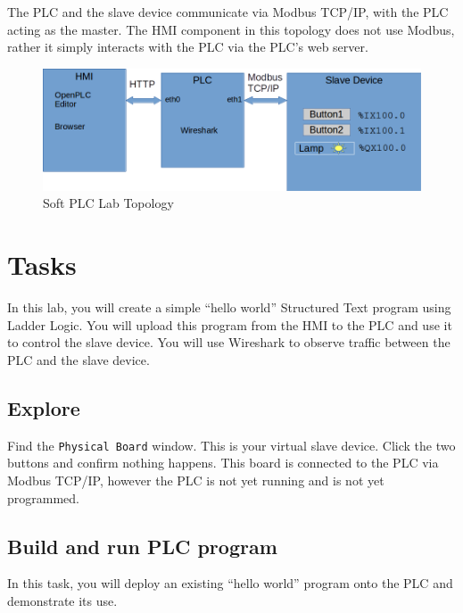 The PLC and the slave device communicate via Modbus TCP/IP, with the PLC acting as the master.  
The HMI component in this topology does not use Modbus, rather it simply interacts with the PLC via the
PLC's web server.
\begin{figure}[H]
\begin{center}
\includegraphics [width=0.8\linewidth]{softplc2.png}
\end{center}
\caption{Soft PLC Lab Topology}
\label{fig:topology}
\end{figure}

\section{Tasks}
In this lab, you will create a simple ``hello world'' Structured Text program using Ladder Logic.  You will upload this program
from the HMI to the PLC and use it to control the slave device.  You will use Wireshark to observe traffic between
the PLC and the slave device.

\subsection{Explore}
Find the {\tt Physical Board} window.  This is your virtual slave device.  Click the two buttons and confirm nothing happens.
This board is connected to the PLC via Modbus TCP/IP, however the PLC is not yet running and is not yet programmed.

\subsection{Build and run PLC program}
In this task, you will deploy an existing ``hello world'' program onto the PLC and demonstrate its use.
